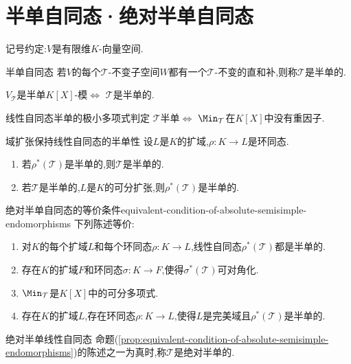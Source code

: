 \section{半单自同态·绝对半单自同态}

记号约定:$V$是有限维$K$-向量空间.

\begin{definition}{半单自同态}{}
	若$V$的每个$\mathcal{T}$-不变子空间$W$都有一个$\mathcal{T}$-不变的直和补,则称$\mathcal{T}$是半单的.
\end{definition}

\begin{remark}{}{}
	$V_{\mathcal{T}}$是半单$K[X]$-模$\iff$ $\mathcal{T}$是半单的.
\end{remark}

\begin{proposition}{线性自同态半单的极小多项式判定}{}
	$\mathcal{T}$半单$\iff$ $\Min_{\mathcal{T}}$在$K\left[X\right]$中没有重因子.
\end{proposition}

\begin{corollary}{域扩张保持线性自同态的半单性}{}
	设$L$是$K$的扩域,$\rho:K\to L$是环同态.
	\begin{enumerate}
		\item 若$\rho^{\ast}\left(\mathcal{T}\right)$是半单的,则$\mathcal{T}$是半单的.
		\item 若$\mathcal{T}$是半单的,$L$是$K$的可分扩张,则$\rho^{\ast}\left(\mathcal{T}\right)$是半单的.
	\end{enumerate}
\end{corollary}

\begin{proposition}{绝对半单自同态的等价条件}{equivalent-condition-of-absolute-semisimple-endomorphisms}
	下列陈述等价:
	\begin{enumerate}
		\item 对$K$的每个扩域$L$和每个环同态$\rho:K\to L$,线性自同态$\rho^{\ast}\left(\mathcal{T}\right)$都是半单的.
		\item 存在$K$的扩域$F$和环同态$\sigma:K\to F$,使得$\sigma^{\ast}\left(\mathcal{T}\right)$可对角化.
		\item $\Min_{\mathcal{T}}$是$K[X]$中的可分多项式.
		\item 存在$K$的扩域$L$,存在环同态$\rho:K\to L$,使得$L$是完美域且$\rho^{\ast}\left(\mathcal{T}\right)$是半单的.
	\end{enumerate}
\end{proposition}

\begin{definition}{绝对半单线性自同态}{}
	命题(\cref{prop:equivalent-condition-of-absolute-semisimple-endomorphisms})的陈述之一为真时,称$\mathcal{T}$是绝对半单的.
\end{definition}

